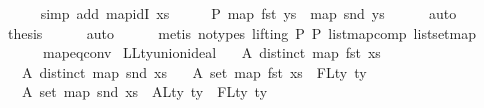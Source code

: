 \begin{isabellebody}
\ \ \ \ \isamarkupfalse%
\ {\isacharparenleft}{\kern0pt}simp\ add{\isacharcolon}{\kern0pt}\ map{\isacharunderscore}{\kern0pt}idI\ xs{\isacharparenleft}{\kern0pt}{}{\isacharparenright}{\kern0pt}{\isacharparenright}{\kern0pt}\isanewline
\ \ \isamarkupfalse%
\ \isamarkupfalse%
\ P{}{\isacharcolon}{\kern0pt}\ {\isachardoublequoteopen}map\ fst\ {\isacharquery}{\kern0pt}ys\ {\isacharequal}{\kern0pt}\ map\ snd\ {\isacharquery}{\kern0pt}ys{\isachardoublequoteclose}\isanewline
\ \ \ \ \isamarkupfalse%
\ auto\isanewline
\ \ \isamarkupfalse%
\ \isamarkupfalse%
\ {\isacharquery}{\kern0pt}thesis\isanewline
\ \ \ \ \isamarkupfalse%
\ auto\isanewline
\ \ \ \ \isamarkupfalse%
\ {\isacharparenleft}{\kern0pt}metis\ {\isacharparenleft}{\kern0pt}no{\isacharunderscore}{\kern0pt}types{\isacharcomma}{\kern0pt}\ lifting{\isacharparenright}{\kern0pt}\ P{}\ P{}\ list{\isachardot}{\kern0pt}map{\isacharunderscore}{\kern0pt}comp\ list{\isachardot}{\kern0pt}set{\isacharunderscore}{\kern0pt}map\isanewline
\ \ \ \ \ \ map{\isacharunderscore}{\kern0pt}eq{\isacharunderscore}{\kern0pt}conv{\isacharparenright}{\kern0pt}\isanewline
{}\isamarkupfalse%
%
\endisatagproof
{\isafoldproof}%
%
\isadelimproof
\isanewline
%
\endisadelimproof
\isanewline
\isanewline
\isanewline
{}\isamarkupfalse%
\ LLty{\isacharunderscore}{\kern0pt}union{\isacharunderscore}{\kern0pt}ideal{\isacharcolon}{\kern0pt}\isanewline
\ \ \ A{}{\isacharcolon}{\kern0pt}\ {\isachardoublequoteopen}distinct\ {\isacharparenleft}{\kern0pt}map\ fst\ xs{\isacharparenright}{\kern0pt}{\isachardoublequoteclose}\isanewline
\ \ \ A{}{\isacharcolon}{\kern0pt}\ {\isachardoublequoteopen}distinct\ {\isacharparenleft}{\kern0pt}map\ snd\ xs{\isacharparenright}{\kern0pt}{\isachardoublequoteclose}\isanewline
\ \ \ A{}{\isacharcolon}{\kern0pt}\ {\isachardoublequoteopen}set\ {\isacharparenleft}{\kern0pt}map\ fst\ xs{\isacharparenright}{\kern0pt}\ {\isacharequal}{\kern0pt}\ FLty\ ty{\isachardoublequoteclose}\isanewline
\ \ \ A{}{\isacharcolon}{\kern0pt}\ {\isachardoublequoteopen}set\ {\isacharparenleft}{\kern0pt}map\ snd\ xs{\isacharparenright}{\kern0pt}\ {\isasyminter}\ ALty\ ty\ {\isacharminus}{\kern0pt}\ FLty\ ty\ {\isacharequal}{\kern0pt}\ {\isacharbraceleft}{\kern0pt}{\isacharbraceright}{\kern0pt}{\isachardoublequoteclose}\isanewline

\end{isabellebody}
